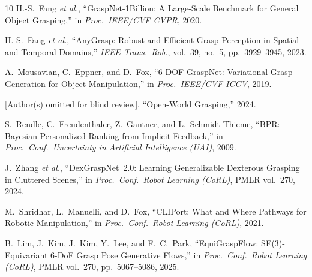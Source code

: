 \documentclass[journal]{IEEEtran}
\begin{document}
\begin{thebibliography}{10}
H.-S.~Fang \emph{et al.},
``GraspNet-1Billion: A Large-Scale Benchmark for General Object Grasping,''
in \emph{Proc.\ IEEE/CVF CVPR}, 2020.

H.-S.~Fang \emph{et al.},
``AnyGrasp: Robust and Efficient Grasp Perception in Spatial and Temporal
  Domains,''
\emph{IEEE Trans.\ Rob.}, vol.~39, no.~5, pp.~3929--3945, 2023.

A.~Mousavian, C.~Eppner, and D.~Fox,
``6-DOF GraspNet: Variational Grasp Generation for Object Manipulation,''
in \emph{Proc.\ IEEE/CVF ICCV}, 2019.

[Author(s) omitted for blind review],
``Open-World Grasping,''
2024.

S.~Rendle, C.~Freudenthaler, Z.~Gantner, and L.~Schmidt-Thieme,
``BPR: Bayesian Personalized Ranking from Implicit Feedback,''
in \emph{Proc.\ Conf.\ Uncertainty in Artificial Intelligence (UAI)}, 2009.

J.~Zhang \emph{et al.},
``DexGraspNet~2.0: Learning Generalizable Dexterous Grasping in
  Cluttered Scenes,''
in \emph{Proc.\ Conf.\ Robot Learning (CoRL)}, PMLR vol.~270, 2024.

M.~Shridhar, L.~Manuelli, and D.~Fox,
``CLIPort: What and Where Pathways for Robotic Manipulation,''
in \emph{Proc.\ Conf.\ Robot Learning (CoRL)}, 2021.

B.~Lim, J.~Kim, J.~Kim, Y.~Lee, and F.~C.~Park,
``EquiGraspFlow: SE(3)-Equivariant 6-DoF Grasp Pose Generative Flows,''
in \emph{Proc.\ Conf.\ Robot Learning (CoRL)}, PMLR vol.~270,
  pp.~5067--5086, 2025.

\end{thebibliography}
\balance
\end{document}
